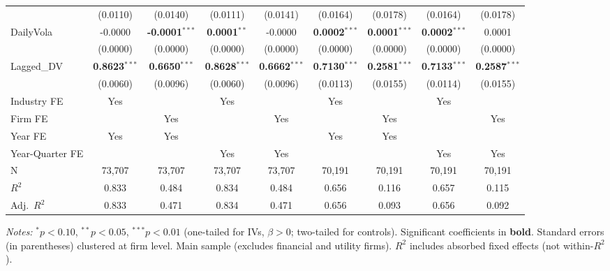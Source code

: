 \begin{landscape}
\begin{table}[H]
\begin{tabular}{lcccccccc}
 & (0.0110) & (0.0140) & (0.0111) & (0.0141) & (0.0164) & (0.0178) & (0.0164) & (0.0178) \\
DailyVola & -0.0000 & \textbf{-0.0001}$^{***}$ & \textbf{0.0001}$^{**}$ & -0.0000 & \textbf{0.0002}$^{***}$ & \textbf{0.0001}$^{***}$ & \textbf{0.0002}$^{***}$ & 0.0001 \\
 & (0.0000) & (0.0000) & (0.0000) & (0.0000) & (0.0000) & (0.0000) & (0.0000) & (0.0000) \\
Lagged\_DV & \textbf{0.8623}$^{***}$ & \textbf{0.6650}$^{***}$ & \textbf{0.8628}$^{***}$ & \textbf{0.6662}$^{***}$ & \textbf{0.7130}$^{***}$ & \textbf{0.2581}$^{***}$ & \textbf{0.7133}$^{***}$ & \textbf{0.2587}$^{***}$ \\
 & (0.0060) & (0.0096) & (0.0060) & (0.0096) & (0.0113) & (0.0155) & (0.0114) & (0.0155) \\
\midrule
Industry FE & Yes &  & Yes &  & Yes &  & Yes &  \\
Firm FE &  & Yes &  & Yes &  & Yes &  & Yes \\
Year FE & Yes & Yes &  &  & Yes & Yes &  &  \\
Year-Quarter FE &  &  & Yes & Yes &  &  & Yes & Yes \\
\midrule
N & 73,707 & 73,707 & 73,707 & 73,707 & 70,191 & 70,191 & 70,191 & 70,191 \\
$R^2$ & 0.833 & 0.484 & 0.834 & 0.484 & 0.656 & 0.116 & 0.657 & 0.115 \\
Adj.~$R^2$ & 0.833 & 0.471 & 0.834 & 0.471 & 0.656 & 0.093 & 0.656 & 0.092 \\
\bottomrule
\end{tabular}
\begin{minipage}{\linewidth}
\vspace{2pt}\scriptsize
\textit{Notes:} $^{*}p<0.10$, $^{**}p<0.05$, $^{***}p<0.01$ (one-tailed for IVs, $\beta > 0$; two-tailed for controls).
 Significant coefficients in \textbf{bold}.
 Standard errors (in parentheses) clustered at firm level.
 Main sample (excludes financial and utility firms).
 $R^2$ includes absorbed fixed effects (not within-$R^2$).
\end{minipage}
\end{table}
\end{landscape}